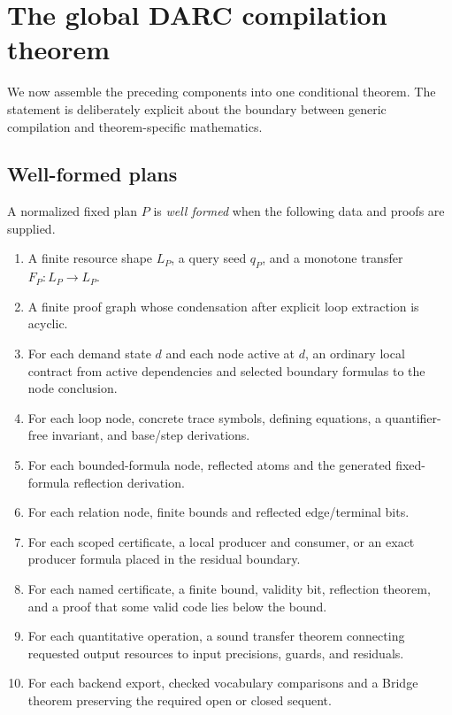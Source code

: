 \section{The global DARC compilation theorem}
\label{sec:global}

We now assemble the preceding components into one conditional theorem.  The
statement is deliberately explicit about the boundary between generic
compilation and theorem-specific mathematics.

\subsection{Well-formed plans}

A normalized fixed plan \(P\) is \emph{well formed} when the following data
and proofs are supplied.

\begin{enumerate}
  \item A finite resource shape \(L_P\), a query seed \(q_P\), and a monotone
        transfer \(F_P:L_P\to L_P\).
  \item A finite proof graph whose condensation after explicit loop extraction
        is acyclic.
  \item For each demand state \(d\) and each node active at \(d\), an ordinary
        local contract from active dependencies and selected boundary formulas
        to the node conclusion.
  \item For each loop node, concrete trace symbols, defining equations, a
        quantifier-free invariant, and base/step derivations.
  \item For each bounded-formula node, reflected atoms and the generated
        fixed-formula reflection derivation.
  \item For each relation node, finite bounds and reflected edge/terminal bits.
  \item For each scoped certificate, a local producer and consumer, or an exact
        producer formula placed in the residual boundary.
  \item For each named certificate, a finite bound, validity bit, reflection
        theorem, and a proof that some valid code lies below the bound.
  \item For each quantitative operation, a sound transfer theorem connecting
        requested output resources to input precisions, guards, and residuals.
  \item For each backend export, checked vocabulary comparisons and a Bridge
        theorem preserving the required open or closed sequent.
\end{enumerate}


